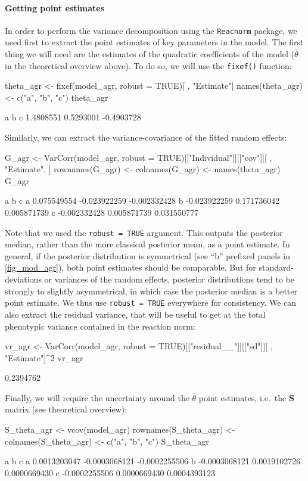 \documentclass[a4paper,12pt,twoside]{article}
\begin{document}
\paragraph{Getting point estimates}
In order to perform the variance decomposition using the \texttt{Reacnorm} package, we need first to extract the point estimates of key parameters in the model. The first thing we will need are the estimates of the quadratic coefficients of the model ($\bar{\theta}$ in the theoretical overview above). To do so, we will use the \texttt{fixef()} function:
\begin{Rinput}
theta_agr <- fixef(model_agr, robust = TRUE)[ , "Estimate"]
names(theta_agr) <- c("a", "b", "c")
theta_agr
\end{Rinput}
\begin{Routput}
         a          b          c 
 1.4808551  0.5293001 -0.4903728 
\end{Routput}
Similarly, we can extract the variance-covariance of the fitted random effects:
\begin{Rinput}
G_agr <-
    VarCorr(model_agr, robust = TRUE)[["Individual"]][["cov"]][ , "Estimate", ]
rownames(G_agr) <- colnames(G_agr) <- names(theta_agr)
G_agr
\end{Rinput}
\begin{Routput}
             a            b            c
a  0.075549554 -0.023922259 -0.002332428
b -0.023922259  0.171736042  0.005871739
c -0.002332428  0.005871739  0.031550777
\end{Routput}
Note that we used the \texttt{robust = TRUE} argument. This outputs the posterior median, rather than the more classical posterior mean, as a point estimate. In general, if the posterior distribution is symmetrical (see ``b'' prefixed panels in \autoref{fig_mod_agr}), both point estimates should be comparable.
But for standard-deviations or variances of the random effects, posterior distributions tend to be strongly to slightly asymmetrical, in which case the posterior median is a better point estimate.
We thus use \texttt{robust = TRUE} everywhere for consistency.
We can also extract the residual variance, that will be useful to get at the total phenotypic variance contained in the reaction norm:
\begin{Rinput}
vr_agr <- VarCorr(model_agr, robust = TRUE)[["residual__"]][["sd"]][ , "Estimate"]^2
vr_agr
\end{Rinput}
\begin{Routput}
[1] 0.2394762
\end{Routput}
Finally, we will require the uncertainty around the $\bar{\theta}$ point estimates, i.e.\ the $\mathbf{S}$ matrix (see theoretical overview):
\begin{Rinput}
S_theta_agr <- vcov(model_agr)
rownames(S_theta_agr) <- colnames(S_theta_agr) <- c("a", "b", "c")
S_theta_agr
\end{Rinput}
\begin{Routput}
              a             b             c
a  0.0013203047 -0.0003068121 -0.0002255506
b -0.0003068121  0.0019102726  0.0000669430
c -0.0002255506  0.0000669430  0.0004393123
\end{Routput}
\end{document}
